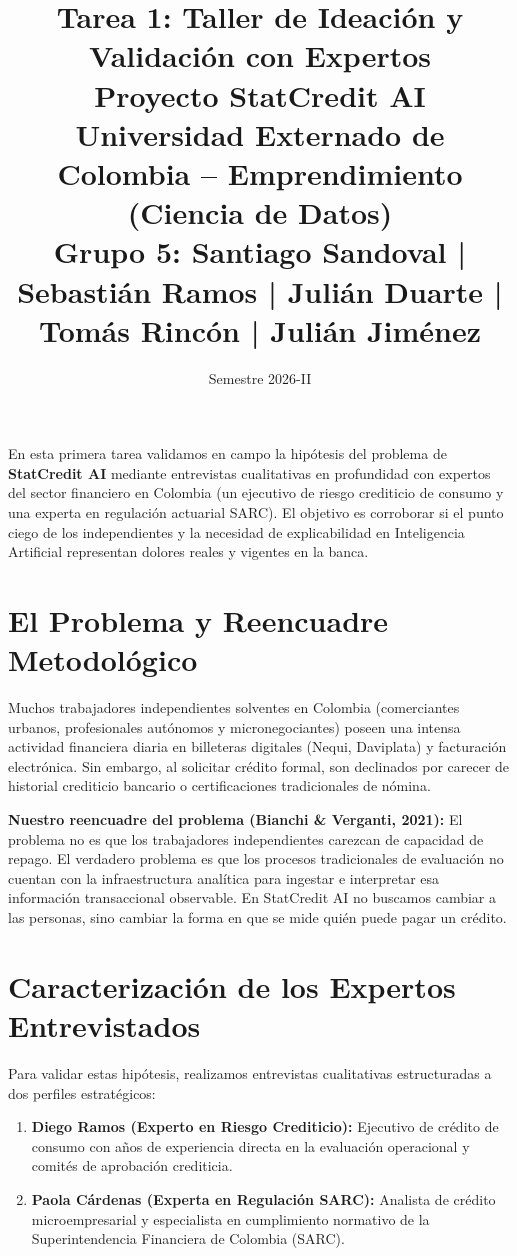 \documentclass[11pt,a4paper]{article}
\title{
    \vspace{-1cm}
    \textbf{\huge Tarea 1: Taller de Ideación y Validación con Expertos}\\[0.3cm]
    \large\textbf{Proyecto StatCredit AI}\\[0.1cm]
    \small Universidad Externado de Colombia -- Emprendimiento (Ciencia de Datos)\\[0.1cm]
    \small\textbf{Grupo 5: Santiago Sandoval | Sebastián Ramos | Julián Duarte | Tomás Rincón | Julián Jiménez}
}
\author{}
\date{Semestre 2026-II}
\begin{document}
\maketitle

\begin{tcolorbox}[colback=primary!5,colframe=primary,title=\textbf{¿De qué trata este entregable?}]
En esta primera tarea validamos en campo la hipótesis del problema de \textbf{StatCredit AI} mediante entrevistas cualitativas en profundidad con expertos del sector financiero en Colombia (un ejecutivo de riesgo crediticio de consumo y una experta en regulación actuarial SARC). El objetivo es corroborar si el punto ciego de los independientes y la necesidad de explicabilidad en Inteligencia Artificial representan dolores reales y vigentes en la banca.
\end{tcolorbox}

\section{El Problema y Reencuadre Metodológico}

Muchos trabajadores independientes solventes en Colombia (comerciantes urbanos, profesionales autónomos y micronegociantes) poseen una intensa actividad financiera diaria en billeteras digitales (Nequi, Daviplata) y facturación electrónica. Sin embargo, al solicitar crédito formal, son declinados por carecer de historial crediticio bancario o certificaciones tradicionales de nómina.

\textbf{Nuestro reencuadre del problema (Bianchi \& Verganti, 2021):}
El problema no es que los trabajadores independientes carezcan de capacidad de repago. El verdadero problema es que los procesos tradicionales de evaluación no cuentan con la infraestructura analítica para ingestar e interpretar esa información transaccional observable. En StatCredit AI no buscamos cambiar a las personas, sino cambiar la forma en que se mide quién puede pagar un crédito.

\section{Caracterización de los Expertos Entrevistados}

Para validar estas hipótesis, realizamos entrevistas cualitativas estructuradas a dos perfiles estratégicos:

\begin{enumerate}[leftmargin=*]
    \item \textbf{Diego Ramos (Experto en Riesgo Crediticio):} Ejecutivo de crédito de consumo con años de experiencia directa en la evaluación operacional y comités de aprobación crediticia.
    \item \textbf{Paola Cárdenas (Experta en Regulación SARC):} Analista de crédito microempresarial y especialista en cumplimiento normativo de la Superintendencia Financiera de Colombia (SARC).
\end{enumerate}
\end{document}
